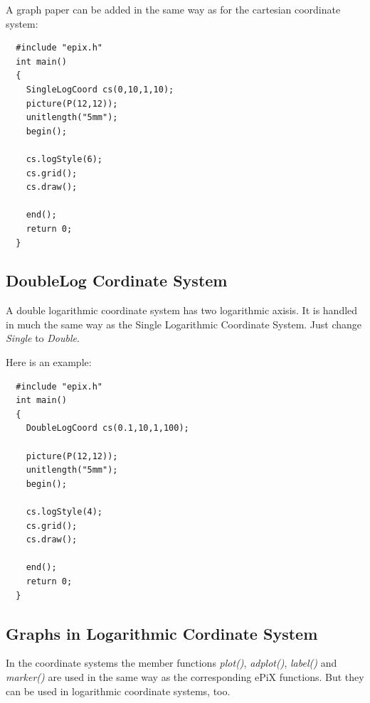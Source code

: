 \documentclass[12pt,a4paper]{article}
\begin{document}
  \newpage
  A graph paper can be added in the same way as for the cartesian
  coordinate system:

  \begin{minipage}{7.5cm}
    \begin{lstlisting}
  #include "epix.h"
  int main()
  {
    SingleLogCoord cs(0,10,1,10);
    picture(P(12,12));
    unitlength("5mm");
    begin();

    cs.logStyle(6);
    cs.grid();
    cs.draw();

    end();
    return 0;
  }
    \end{lstlisting}
  \end{minipage}
  \begin{minipage}{5.5cm}
    
  \end{minipage}

  \subsection{DoubleLog Cordinate System}

  A double logarithmic coordinate system has two logarithmic
  axisis. It is handled in much the same way as the Single Logarithmic
  Coordinate System.  Just change \textit{Single} to \textit{Double}.

  Here is an example:

  \begin{minipage}{7.7cm}
    \begin{lstlisting}
  #include "epix.h"
  int main()
  {
    DoubleLogCoord cs(0.1,10,1,100);

    picture(P(12,12));
    unitlength("5mm");
    begin();

    cs.logStyle(4);
    cs.grid();
    cs.draw();

    end();
    return 0;
  }
    \end{lstlisting}
  \end{minipage}
  \begin{minipage}{5.5cm}
    
  \end{minipage}

  \subsection{Graphs in Logarithmic Cordinate System}

  In the coordinate systems the member functions \textit{plot()},
  \textit{adplot()}, \textit{label()} and \textit{marker()} are used
  in the same way as the corresponding ePiX functions. But they can be
  used in logarithmic coordinate systems, too.
\end{document}

